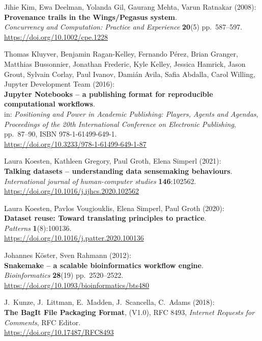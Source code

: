 Jihie Kim, Ewa Deelman, Yolanda Gil, Gaurang Mehta, Varun
Ratnakar (2008):\\
\textbf{Provenance trails in the Wings/Pegasus system}.\\
\emph{Concurrency and Computation: Practice and Experience}
\textbf{20}(5) pp.~587--597.\\
\url{https://doi.org/10.1002/cpe.1228}

Thomas Kluyver, Benjamin Ragan-Kelley, Fernando Pérez, Brian
Granger, Matthias Bussonnier, Jonathan Frederic, Kyle Kelley, Jessica
Hamrick, Jason Grout, Sylvain Corlay, Paul Ivanov, Damián Avila, Safia
Abdalla, Carol Willing, Jupyter Development Team (2016):\\
\textbf{Jupyter Notebooks -- a publishing format for reproducible
computational workflows}.\\
in: \emph{Positioning and Power in Academic Publishing: Players, Agents
and Agendas},\\
\emph{Proceedings of the 20th International Conference on Electronic
Publishing}, pp.~87--90, ISBN 978-1-61499-649-1.\\
\url{https://doi.org/10.3233/978-1-61499-649-1-87}

Laura Koesten, Kathleen Gregory, Paul Groth, Elena Simperl
(2021):\\
\textbf{Talking datasets -- understanding data sensemaking
behaviours}.\\
\emph{International journal of human-computer studies}
\textbf{146}:102562.\\
\url{https://doi.org/10.1016/j.ijhcs.2020.102562}

Laura Koesten, Pavlos Vougiouklis, Elena Simperl, Paul Groth
(2020):\\
\textbf{Dataset reuse: Toward translating principles to practice}.\\
\emph{Patterns} \textbf{1}(8):100136.\\
\url{https://doi.org/10.1016/j.patter.2020.100136}

Johannes Köster, Sven Rahmann (2012):\\
\textbf{Snakemake -- a scalable bioinformatics workflow engine}.\\
\emph{Bioinformatics} \textbf{28}(19) pp.~2520--2522.\\
\url{https://doi.org/10.1093/bioinformatics/bts480}

J.~Kunze, J.~Littman, E.~Madden, J.~Scancella, C.~Adams
(2018):\\
\textbf{The BagIt File Packaging Format}, (V1.0), RFC 8493,
\emph{Internet Requests for Comments}, RFC Editor.\\
\url{https://doi.org/10.17487/RFC8493}

